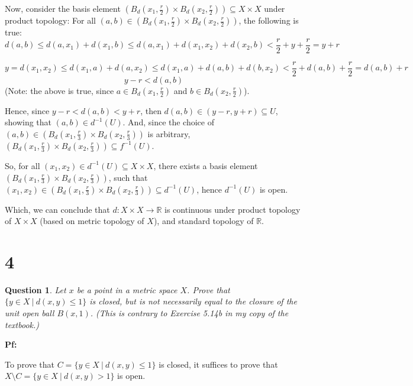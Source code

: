 \documentclass{article}
\newtheorem{question}{Question}
\begin{document}
\hfill

Now, consider the basis element $\left(B_d(x_1,\frac{r}{2})\times B_d(x_2,\frac{r}{2})\right)\subseteq X\times X$ under product topology:
For all $(a,b)\in \left(B_d(x_1,\frac{r}{2})\times B_d(x_2,\frac{r}{2})\right)$, the following is true:
$$d(a,b) \leq d(a,x_1) + d(x_1,b) \leq d(a,x_1)+d(x_1,x_2)+d(x_2,b) < \frac{r}{2}+y+\frac{r}{2} = y+r$$

$$y=d(x_1,x_2) \leq d(x_1,a)+d(a,x_2)\leq d(x_1,a)+d(a,b)+d(b,x_2) < \frac{r}{2}+d(a,b)+\frac{r}{2} = d(a,b)+r$$
$$y-r < d(a,b)$$
(Note: the above is true, since $a\in B_d(x_1,\frac{r}{2})$ and $b\in B_d(x_2,\frac{r}{2})$).

Hence, since $y-r < d(a,b) < y+r$, then $d(a,b)\in (y-r,y+r)\subseteq U$, showing that $(a,b)\in d^{-1}(U)$.
And, since the choice of $(a,b)\in \left(B_d(x_1,\frac{r}{3})\times B_d(x_2,\frac{r}{3})\right)$ is arbitrary, $\left(B_d(x_1,\frac{r}{3})\times B_d(x_2,\frac{r}{3})\right) \subseteq f^{-1}(U)$.

\hfill

So, for all $(x_1,x_2) \in d^{-1}(U) \subseteq X\times X$, there exists a basis element $\left(B_d(x_1,\frac{r}{3})\times B_d(x_2,\frac{r}{3})\right)$, 
such that $(x_1,x_2)\in \left(B_d(x_1,\frac{r}{3})\times B_d(x_2,\frac{r}{3})\right)\subseteq d^{-1}(U)$,
hence $d^{-1}(U)$ is open.

Which, we can conclude that $d:X\times X\rightarrow \mathbb{R}$ is continuous under product topology of $X\times X$ (based on metric topology of $X$), and standard topology of $\mathbb{R}$.

\break

\section*{4}
\begin{myBox}[]{}
    \begin{question}
        Let $x$ be a point in a metric space $X$. Prove that $\{y\in X\ |\ d(x,y)\leq 1\}$ is
        closed, but is not necessarily equal to the closure of the unit open ball $B(x, 1)$.
        (This is contrary to Exercise 5.14b in my copy of the textbook.)
    \end{question}
\end{myBox}

\textbf{Pf:}

To prove that $C=\{y\in X\ |\ d(x,y)\leq 1\}$ is closed, it suffices to prove that $X\setminus C = \{y\in X\ |\ d(x,y)>1\}$ is open.
\end{document}
